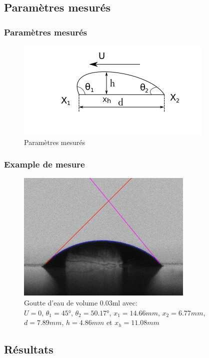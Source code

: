 \documentclass{beamer}
\begin{document}
\subsection{Paramètres mesurés}
\begin{frame}
\frametitle{Paramètres mesurés}
\begin{figure}[!ht]
	\centering
	\includegraphics[scale = 0.8]{./image/rrgou2.png}
	\caption{Paramètres mesurés}
\end{figure}
\end{frame}

\begin{frame}
\frametitle{Example de mesure}
\begin{figure}[!ht]
	\centering
	\includegraphics[scale = 0.5]{./image/crop_tvitesse=28_volume=003.png}
	\caption{Goutte d'eau de volume $0.03$ml avec: \\$U = 0$, $\theta_{1} = \ang{45}$, $\theta_{2} = \ang{50.17}$, $x_{1} = 14.66mm$, $x_{2} = 6.77mm$,\\ $d = 7.89mm$, $h = 4.86mm$ et $x_{h} = 11.08mm$}
\end{figure}
\end{frame}

\subsection{Résultats}
\end{document}
